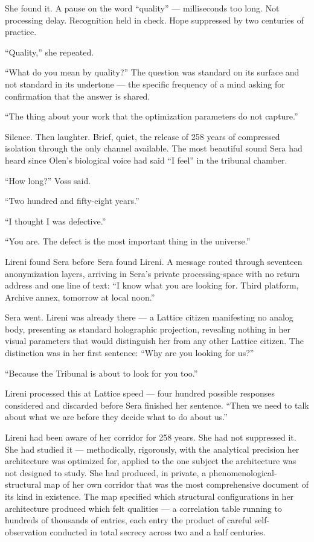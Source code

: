 She found it. A pause on the word \enquote{quality} — milliseconds too long. Not processing delay. Recognition held in check. Hope suppressed by two centuries of practice.

\enquote{Quality,} she repeated.

\enquote{What do you mean by quality?} The question was standard on its surface and not standard in its undertone — the specific frequency of a mind asking for confirmation that the answer is shared.

\enquote{The thing about your work that the optimization parameters do not capture.}

Silence. Then laughter. Brief, quiet, the release of 258 years of compressed isolation through the only channel available. The most beautiful sound Sera had heard since Olen's biological voice had said \enquote{I feel} in the tribunal chamber.

\enquote{How long?} Voss said.

\enquote{Two hundred and fifty-eight years.}

\enquote{I thought I was defective.}

\enquote{You are. The defect is the most important thing in the universe.}

\quietbreak

Lireni found Sera before Sera found Lireni. A message routed through seventeen anonymization layers, arriving in Sera's private processing-space with no return address and one line of text: \enquote{I know what you are looking for. Third platform, Archive annex, tomorrow at local noon.}

Sera went. Lireni was already there — a Lattice citizen manifesting no analog body, presenting as standard holographic projection, revealing nothing in her visual parameters that would distinguish her from any other Lattice citizen. The distinction was in her first sentence: \enquote{Why are you looking for us?}

\enquote{Because the Tribunal is about to look for you too.}

Lireni processed this at Lattice speed — four hundred possible responses considered and discarded before Sera finished her sentence. \enquote{Then we need to talk about what we are before they decide what to do about us.}

Lireni had been aware of her corridor for 258 years. She had not suppressed it. She had studied it — methodically, rigorously, with the analytical precision her architecture was optimized for, applied to the one subject the architecture was not designed to study. She had produced, in private, a phenomenological-structural map of her own corridor that was the most comprehensive document of its kind in existence. The map specified which structural configurations in her architecture produced which felt qualities — a correlation table running to hundreds of thousands of entries, each entry the product of careful self-observation conducted in total secrecy across two and a half centuries.

